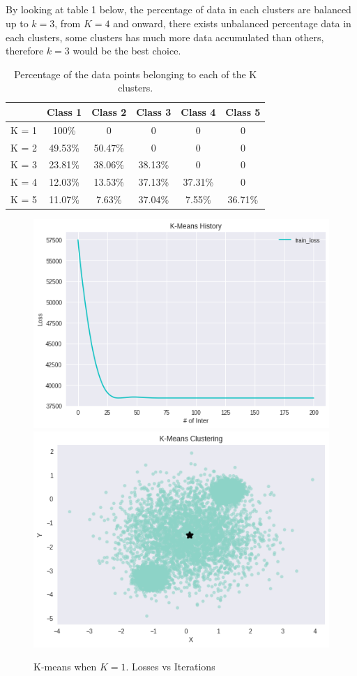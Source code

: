\documentclass[10pt,letterpaper]{article}
\begin{document}
 
\subsection{}

\qquad By looking at table 1 below, the percentage of data in each clusters are balanced up to $k=3$, from $K=4$ and onward, there exists unbalanced percentage data in each clusters, some clusters has much more data accumulated than others, therefore $k=3$ would be the best choice.\\

\begin{table}[H]
\centering
{\small

\begin{tabular}{cccccc}
\hline
 & Class 1  & Class 2      & Class 3 & Class 4 & Class 5\\ \hline
K = 1 & 100\%  & 0 & 0 & 0 & 0\\ 
K = 2 & 49.53\% & 50.47\% & 0 & 0 & 0\\ 
K = 3 & 23.81\% & 38.06\% & 38.13\% & 0 & 0\\
K = 4 & 12.03\% & 13.53\% & 37.13\% & 37.31\% & 0 \\
K = 5 & 11.07\% & 7.63\% & 37.04\% & 7.55\% & 36.71\% \\ \hline
\end{tabular}
}
\vspace{-0.2cm}
\caption{Percentage of the data points belonging to each of the K clusters.}
\label{tab:Number of hidden units}
\vspace{-0.4cm}
\end{table}


\begin{figure}[H]
\centering

  \includegraphics[width=.42\linewidth]{imgs/1_2_k1l.png}
  \includegraphics[width=.42\linewidth]{imgs/1_2_k1p.png}
  \caption{K-means when $K=1$. Losses vs Iterations}
  

\end{figure}
\end{document}
